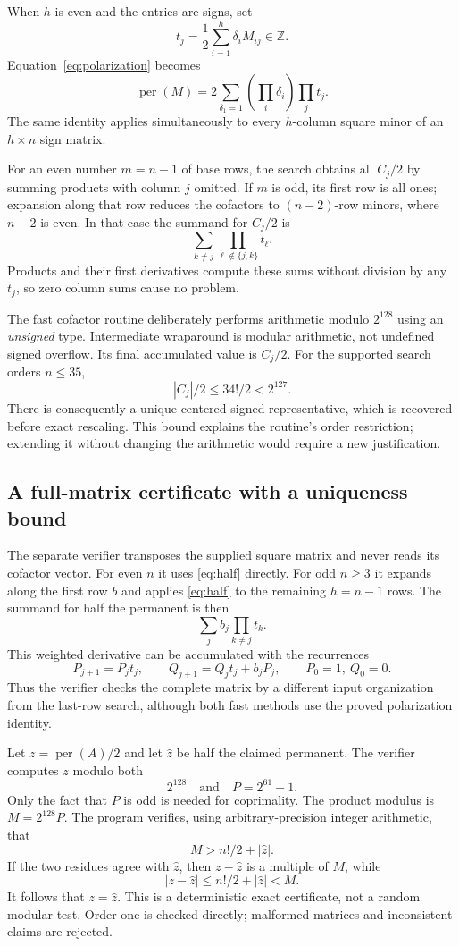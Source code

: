 \documentclass[11pt,a4paper]{article}
\theoremstyle{remark}\newtheorem{remark}[theorem]{Remark}
\DeclareMathOperator{\per}{per}
\begin{document}
When $h$ is even and the entries are signs, set
\[
 t_j=\frac12\sum_{i=1}^h\delta_iM_{ij}\in\mathbb Z.
\]
Equation~\eqref{eq:polarization} becomes
\begin{equation}\label{eq:half}
 \per(M)=2\sum_{\delta_1=1}\left(\prod_i\delta_i\right)\prod_j t_j.
\end{equation}
The same identity applies simultaneously to every $h$-column square minor of an $h\times n$ sign matrix.

For an even number $m=n-1$ of base rows, the search obtains all $C_j/2$ by summing products with column $j$ omitted. If $m$ is odd, its first row is all ones; expansion along that row reduces the cofactors to $(n-2)$-row minors, where $n-2$ is even. In that case the summand for $C_j/2$ is
\[
 \sum_{k\ne j}\prod_{\ell\notin\{j,k\}}t_\ell.
\]
Products and their first derivatives compute these sums without division by any $t_j$, so zero column sums cause no problem.

The fast cofactor routine deliberately performs arithmetic modulo $2^{128}$ using an \emph{unsigned} type. Intermediate wraparound is modular arithmetic, not undefined signed overflow. Its final accumulated value is $C_j/2$. For the supported search orders $n\leq35$,
\[
 |C_j|/2\leq34!/2<2^{127}.
\]
There is consequently a unique centered signed representative, which is recovered before exact rescaling. This bound explains the routine's order restriction; extending it without changing the arithmetic would require a new justification.

\subsection{A full-matrix certificate with a uniqueness bound}
The separate verifier transposes the supplied square matrix and never reads its cofactor vector. For even $n$ it uses \eqref{eq:half} directly. For odd $n\geq3$ it expands along the first row $b$ and applies \eqref{eq:half} to the remaining $h=n-1$ rows. The summand for half the permanent is then
\[
 \sum_j b_j\prod_{k\ne j}t_k.
\]
This weighted derivative can be accumulated with the recurrences
\[
 P_{j+1}=P_jt_j,\qquad Q_{j+1}=Q_jt_j+b_jP_j,
 \qquad P_0=1,\ Q_0=0.
\]
Thus the verifier checks the complete matrix by a different input organization from the last-row search, although both fast methods use the proved polarization identity.

Let $z=\per(A)/2$ and let $\widehat z$ be half the claimed permanent. The verifier computes $z$ modulo both
\[
 2^{128}\quad\text{and}\quad P=2^{61}-1.
\]
Only the fact that $P$ is odd is needed for coprimality. The product modulus is $M=2^{128}P$. The program verifies, using arbitrary-precision integer arithmetic, that
\begin{equation}\label{eq:crtbound}
 M>n!/2+|\widehat z|.
\end{equation}
If the two residues agree with $\widehat z$, then $z-\widehat z$ is a multiple of $M$, while
\[
 |z-\widehat z|\leq n!/2+|\widehat z|<M.
\]
It follows that $z=\widehat z$. This is a deterministic exact certificate, not a random modular test. Order one is checked directly; malformed matrices and inconsistent claims are rejected.
\end{document}
